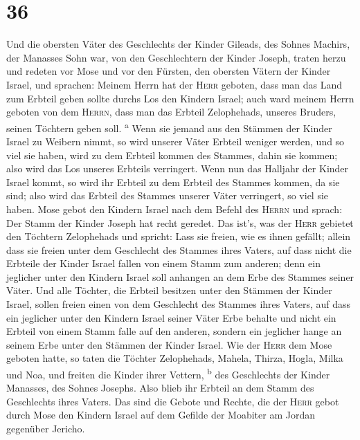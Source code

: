 \hypertarget{section-35}{%
\section{36}\label{section-35}}

 Und die obersten Väter des Geschlechts der Kinder
Gileads, des Sohnes Machirs, der Manasses Sohn war, von den
Geschlechtern der Kinder Joseph, traten herzu und redeten vor Mose und
vor den Fürsten, den obersten Vätern der Kinder Israel, 
und sprachen: Meinem Herrn hat der \textsc{Herr} geboten, dass man das
Land zum Erbteil geben sollte durchs Los den Kindern Israel; auch ward
meinem Herrn geboten von dem \textsc{Herrn}, dass man das Erbteil
Zelophehads, unseres Bruders, seinen Töchtern geben soll.
\textsuperscript{a}  Wenn sie jemand aus den Stämmen der
Kinder Israel zu Weibern nimmt, so wird unserer Väter Erbteil weniger
werden, und so viel sie haben, wird zu dem Erbteil kommen des Stammes,
dahin sie kommen; also wird das Los unseres Erbteils verringert.
 Wenn nun das Halljahr der Kinder Israel kommt, so wird
ihr Erbteil zu dem Erbteil des Stammes kommen, da sie sind; also wird
das Erbteil des Stammes unserer Väter verringert, so viel sie haben.
 Mose gebot den Kindern Israel nach dem Befehl des
\textsc{Herrn} und sprach: Der Stamm der Kinder Joseph hat recht
geredet.  Das ist's, was der \textsc{Herr} gebietet den
Töchtern Zelophehads und spricht: Lass sie freien, wie es ihnen gefällt;
allein dass sie freien unter dem Geschlecht des Stammes ihres Vaters,
 auf dass nicht die Erbteile der Kinder Israel fallen von
einem Stamm zum anderen; denn ein jeglicher unter den Kindern Israel
soll anhangen an dem Erbe des Stammes seiner Väter.  Und
alle Töchter, die Erbteil besitzen unter den Stämmen der Kinder Israel,
sollen freien einen von dem Geschlecht des Stammes ihres Vaters, auf
dass ein jeglicher unter den Kindern Israel seiner Väter Erbe behalte
 und nicht ein Erbteil von einem Stamm falle auf den
anderen, sondern ein jeglicher hange an seinem Erbe unter den Stämmen
der Kinder Israel.  Wie der \textsc{Herr} dem Mose
geboten hatte, so taten die Töchter Zelophehads,  Mahela,
Thirza, Hogla, Milka und Noa, und freiten die Kinder ihrer Vettern,
\textsuperscript{b}  des Geschlechts der Kinder Manasses,
des Sohnes Josephs. Also blieb ihr Erbteil an dem Stamm des Geschlechts
ihres Vaters.  Das sind die Gebote und Rechte, die der
\textsc{Herr} gebot durch Mose den Kindern Israel auf dem Gefilde der
Moabiter am Jordan gegenüber Jericho.

